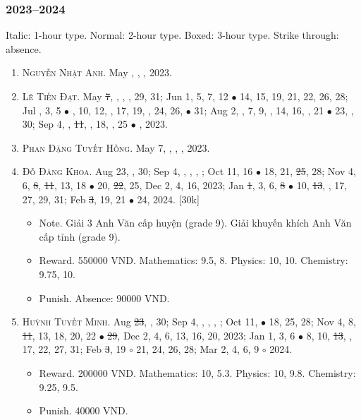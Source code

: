 \documentclass{article}
\begin{document}
\subsubsection{2023--2024}
Italic: 1-hour type. Normal: 2-hour type. Boxed: 3-hour type. Strike through: absence.
\begin{enumerate}
	\item \textsc{Nguyễn Nhật Anh.} {\sf[In]} May , , , 2023. {\sf[Out]}
	\item \textsc{Lê Tiến Đạt.} May \st{7}, , , , 29, 31; Jun 1, 5, 7, 12 $\bullet$ 14, 15, 19, 21, 22, 26, 28; Jul , 3, 5 $\bullet$ , 10, 12, , 17, 19, , 24, 26,  $\bullet$ 31; Aug 2, , 7, 9, , 14, 16, , 21 $\bullet$ 23, , 30; Sep 4, , \st{11}, , 18, , 25 $\bullet$ , 2023. {\sf[Out]}
	\item \textsc{Phan Đặng Tuyết Hồng.} May 7, , , , 2023. {\sf[Out]}
	\item \textsc{Đỗ Đăng Khoa.} {\sf[In]} Aug 23, , 30; Sep 4, , , , ; Oct 11, 16 $\bullet$ 18, 21, \st{25}, 28; Nov 4, 6, \st{8}, \st{11}, 13, 18 $\bullet$ 20, \st{22}, 25, Dec 2, 4, 16, 2023; Jan \st{1}, 3, 6, \st{8} $\bullet$ 10, \st{13}, , 17, 27, 29, 31; Feb \st{3}, 19, 21 $\bullet$ 24, 2024. [30k]
	\begin{itemize}
		\item {\sf Note.} Giải 3 Anh Văn cấp huyện (grade 9). Giải khuyến khích Anh Văn cấp tỉnh (grade 9).
		\item {\sf Reward.} 550000 VND. Mathematics: 9.5, 8. Physics: 10, 10. Chemistry: 9.75, 10.
		\item {\sf Punish.} Absence: 90000 VND.
	\end{itemize}
	\item \textsc{Huỳnh Tuyết Minh.} {\sf[In]} Aug \st{23}, , 30; Sep 4, , , , ; Oct 11,  $\bullet$ 18, 25, 28; Nov 4, 8, \st{11}, 13, 18, 20, 22 $\bullet$ \st{29}, Dec 2, 4, 6, 13, 16, 20, 2023; Jan 1, 3, 6 $\bullet$ 8, 10, \st{13}, , 17, 22, 27, 31; Feb \st{3}, 19 $\circ$ 21, 24, 26, 28; Mar 2, 4, 6, 9 $\circ$ 2024.
	\begin{itemize}
		\item {\sf Reward.} 200000 VND. Mathematics: 10, 5.3. Physics: 10, 9.8. Chemistry: 9.25, 9.5.
		\item {\sf Punish.} 40000 VND.

\end{itemize}
\end{enumerate}
\end{document}
